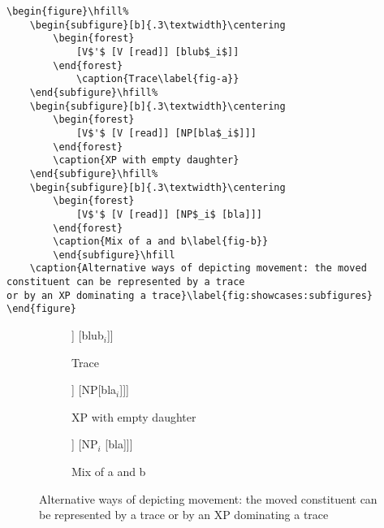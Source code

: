 \begin{verbatim}
\begin{figure}\hfill%
	\begin{subfigure}[b]{.3\textwidth}\centering
		\begin{forest}
			[V$'$ [V [read]] [blub$_i$]]
		\end{forest}
			\caption{Trace\label{fig-a}}
	\end{subfigure}\hfill%
	\begin{subfigure}[b]{.3\textwidth}\centering
		\begin{forest}
			[V$'$ [V [read]] [NP[bla$_i$]]]
		\end{forest}
		\caption{XP with empty daughter}
	\end{subfigure}\hfill%
	\begin{subfigure}[b]{.3\textwidth}\centering
		\begin{forest}
			[V$'$ [V [read]] [NP$_i$ [bla]]]
		\end{forest}
		\caption{Mix of a and b\label{fig-b}}
		\end{subfigure}\hfill
	\caption{Alternative ways of depicting movement: the moved constituent can be represented by a trace
or by an XP dominating a trace}\label{fig:showcases:subfigures}
\end{figure}
\end{verbatim}

\begin{figure}\hfill%
	\begin{subfigure}[b]{.3\textwidth}\centering
		\begin{forest}
			[V$'$ [V [read]] [blub$_i$]]
		\end{forest}
			\caption{Trace\label{fig-a}}
	\end{subfigure}\hfill%
	\begin{subfigure}[b]{.3\textwidth}\centering
		\begin{forest}
			[V$'$ [V [read]] [NP[bla$_i$]]]
		\end{forest}
		\caption{XP with empty daughter}
	\end{subfigure}\hfill%
	\begin{subfigure}[b]{.3\textwidth}\centering
		\begin{forest}
			[V$'$ [V [read]] [NP$_i$ [bla]]]
		\end{forest}
		\caption{Mix of a and b\label{fig-b}}
		\end{subfigure}\hfill
	\caption{Alternative ways of depicting movement: the moved constituent can be represented by a trace
or by an XP dominating a trace}\label{fig:showcases:subfigures}
\end{figure}

